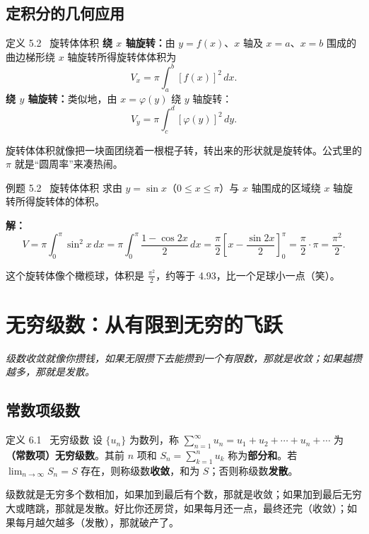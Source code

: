 \documentclass[12pt,a4paper]{article}
\newcommand{\humor}[1]{\par\smallskip\begin{humorbox}#1\end{humorbox}\smallskip}
\begin{document}
\subsection{定积分的几何应用}

\begin{defbox}{定义 5.2 \ 旋转体体积}
\textbf{绕 $x$ 轴旋转：}由 $y = f(x)$、$x$ 轴及 $x = a$、$x = b$ 围成的曲边梯形绕 $x$ 轴旋转所得旋转体体积为
\[
V_x = \pi \int_a^b [f(x)]^2\,dx.
\]
\textbf{绕 $y$ 轴旋转：}类似地，由 $x = \varphi(y)$ 绕 $y$ 轴旋转：
\[
V_y = \pi \int_c^d [\varphi(y)]^2\,dy.
\]
\end{defbox}
\humor{旋转体体积就像把一块面团绕着一根棍子转，转出来的形状就是旋转体。公式里的 $\pi$ 就是“圆周率”来凑热闹。}

\begin{exbox}{例题 5.2 \ 旋转体体积}
求由 $y = \sin x$（$0 \leqslant x \leqslant \pi$）与 $x$ 轴围成的区域绕 $x$ 轴旋转所得旋转体的体积。

\sffamily\textbf{解：}\normalfont
\[
V = \pi\int_0^\pi \sin^2 x\,dx = \pi \int_0^\pi \frac{1-\cos 2x}{2}\,dx = \frac{\pi}{2}\left[x - \frac{\sin 2x}{2}\right]_0^\pi = \frac{\pi}{2}\cdot\pi = \frac{\pi^2}{2}.
\]
\end{exbox}
\humor{这个旋转体像个橄榄球，体积是 $\frac{\pi^2}{2}$，约等于 4.93，比一个足球小一点（笑）。}

\newpage
\section{无穷级数：从有限到无穷的飞跃}
\begin{center}\textcolor{Sunshine}{\itshape 级数收敛就像你攒钱，如果无限攒下去能攒到一个有限数，那就是收敛；如果越攒越多，那就是发散。}\end{center}

\subsection{常数项级数}

\begin{defbox}{定义 6.1 \ 无穷级数}
设 $\{u_n\}$ 为数列，称 $\displaystyle\sum_{n=1}^{\infty} u_n = u_1 + u_2 + \cdots + u_n + \cdots$ 为\textbf{（常数项）无穷级数}。其前 $n$ 项和 $S_n = \sum_{k=1}^{n} u_k$ 称为\textbf{部分和}。若 $\displaystyle\lim_{n\to\infty} S_n = S$ 存在，则称级数\textbf{收敛}，和为 $S$；否则称级数\textbf{发散}。
\end{defbox}
\humor{级数就是无穷多个数相加，如果加到最后有个数，那就是收敛；如果加到最后无穷大或瞎跳，那就是发散。好比你还房贷，如果每月还一点，最终还完（收敛）；如果每月越欠越多（发散），那就破产了。}
\end{document}
